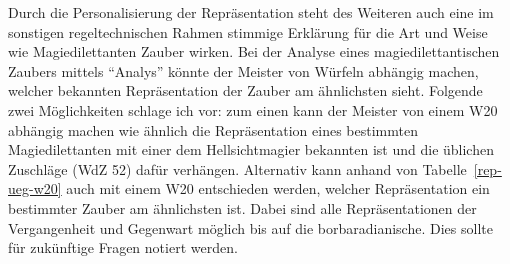 Durch die Personalisierung der Repräsentation steht des Weiteren auch eine im sonstigen regeltechnischen Rahmen stimmige Erklärung für die Art und Weise wie Magiedilettanten Zauber wirken. Bei der Analyse eines magiedilettantischen Zaubers mittels \enquote{Analys} könnte der Meister von Würfeln abhängig machen, welcher bekannten Repräsentation der Zauber am ähnlichsten sieht. Folgende zwei Möglichkeiten schlage ich vor: zum einen kann der Meister von einem W20 abhängig machen wie ähnlich die Repräsentation eines bestimmten Magiedilettanten mit einer dem Hellsichtmagier bekannten ist und die üblichen Zuschläge (WdZ 52) dafür verhängen. Alternativ kann anhand von Tabelle~\ref{rep-ueg-w20} auch mit einem W20 entschieden werden, welcher Repräsentation ein bestimmter Zauber am ähnlichsten ist. Dabei sind alle Repräsentationen der Vergangenheit und Gegenwart möglich bis auf die borbaradianische. Dies sollte für zukünftige Fragen notiert werden.
